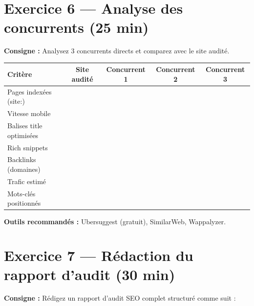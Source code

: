 \documentclass[12pt,a4paper]{report}
\begin{document}
\section{Exercice 6 --- Analyse des concurrents (25 min)}

\textbf{Consigne :} Analysez 3 concurrents directs et comparez avec le site audité.

\begin{tabular}{|l|c|c|c|c|}
\hline
\textbf{Critère} & \textbf{Site audité} & \textbf{Concurrent 1} & \textbf{Concurrent 2} & \textbf{Concurrent 3} \\
\hline
Pages indexées (site:) & & & & \\
\hline
Vitesse mobile & & & & \\
\hline
Balises title optimisées & & & & \\
\hline
Rich snippets & & & & \\
\hline
Backlinks (domaines) & & & & \\
\hline
Trafic estimé & & & & \\
\hline
Mots-clés positionnés & & & & \\
\hline
\end{tabular}

\textbf{Outils recommandés :} Ubersuggest (gratuit), SimilarWeb, Wappalyzer.

\section{Exercice 7 --- Rédaction du rapport d'audit (30 min)}

\textbf{Consigne :} Rédigez un rapport d'audit SEO complet structuré comme suit :
\end{document}
